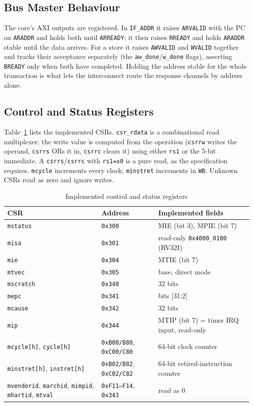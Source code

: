 \documentclass[journal,10pt]{IEEEtran}
\newcommand{\reg}[1]{\texttt{#1}}
\begin{document}
\subsection{Bus Master Behaviour}
The core's AXI outputs are registered. In \reg{IF\_ADDR} it raises
\reg{ARVALID} with the PC on \reg{ARADDR} and holds both until
\reg{ARREADY}; it then raises \reg{RREADY} and holds \reg{ARADDR} stable
until the data arrives. For a store it raises \reg{AWVALID} and
\reg{WVALID} together and tracks their acceptance separately (the
\reg{aw\_done}/\reg{w\_done} flags), asserting \reg{BREADY} only when both
have completed. Holding the address stable for the whole transaction is what
lets the interconnect route the response channels by address alone.

\subsection{Control and Status Registers}
Table~\ref{tab:csr} lists the implemented CSRs. \reg{csr\_rdata} is a
combinational read multiplexer; the write value is computed from the
operation (\reg{csrrw} writes the operand, \reg{csrrs} ORs it in,
\reg{csrrc} clears it) using either \reg{rs1} or the 5-bit immediate. A
\reg{csrrs}/\reg{csrrc} with \reg{rs1=x0} is a pure read, as the
specification requires. \reg{mcycle} increments every clock; \reg{minstret}
increments in \reg{WB}. Unknown CSRs read as zero and ignore writes.

\begin{table}[t]
\caption{Implemented control and status registers}
\label{tab:csr}
\centering
\scriptsize
\begin{tabular}{@{}p{2.4cm}p{2.0cm}p{3.4cm}@{}}
\toprule
CSR & Address & Implemented fields \\
\midrule
\reg{mstatus}  & \reg{0x300} & MIE (bit 3), MPIE (bit 7) \\
\reg{misa}     & \reg{0x301} & read-only \reg{0x4000\_0100} (RV32I) \\
\reg{mie}      & \reg{0x304} & MTIE (bit 7) \\
\reg{mtvec}    & \reg{0x305} & base, direct mode \\
\reg{mscratch} & \reg{0x340} & 32 bits \\
\reg{mepc}     & \reg{0x341} & bits [31:2] \\
\reg{mcause}   & \reg{0x342} & 32 bits \\
\reg{mip}      & \reg{0x344} & MTIP (bit 7) = timer IRQ input, read-only \\
\reg{mcycle[h]}, \reg{cycle[h]} & \reg{0xB00/B80}, \reg{0xC00/C80} & 64-bit clock counter \\
\reg{minstret[h]}, \reg{instret[h]} & \reg{0xB02/B82}, \reg{0xC02/C82} & 64-bit retired-instruction counter \\
\reg{mvendorid}, \reg{marchid}, \reg{mimpid}, \reg{mhartid}, \reg{mtval} & \reg{0xF11--F14}, \reg{0x343} & read as 0 \\
\bottomrule
\end{tabular}
\end{table}
\end{document}
